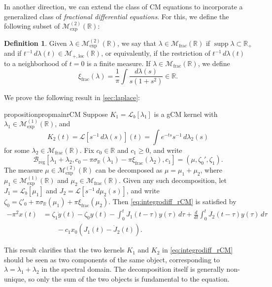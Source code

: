 \documentclass{cams-l} %
\newcommand{\dave}[1]{#1}\newcommand{\davebegin}{}\newcommand{\daveend}{}\newcommand{\george}[1]{#1}
\newcommand{\RR}{\mathbb R}
\newcommand{\cL}{\mathcal L}
\newcommand{\cM}{\mathcal M}
\newcommand{\cB}{\mathcal B}
\newcommand{\supp}{\operatorname{supp}}
\theoremstyle{definition}
\newtheorem{definition}[theorem]{Definition}
\theoremstyle{remark}
\numberwithin{equation}{section}
\begin{document}
In another direction, we can extend the class of CM equations to incorporate a generalized class of \emph{fractional differential equations}. For this, we define the following subset of $\cM_\mathrm{exp}^{(2)}(\RR)$:
\begin{definition}
    Given $\lambda\in\cM_\mathrm{exp}^{(2)}(\RR)$, we say that $\lambda\in\cM_\mathrm{frac}(\RR)$ if \dave{$\supp\lambda\subset\RR_+$} and if $t^{-1}\,d\lambda(t)\in\cM_{+,\mathrm{loc}}(\RR)$, or equivalently, if the restriction of $t^{-1}\,d\lambda(t)$ to a neighborhood of $t=0$ is a finite measure. If $\lambda\in\cM_\mathrm{frac}(\RR)$, we define
    \[\xi_\mathrm{frac}(\lambda) = \frac{1}{\pi}\int\frac{d\lambda(s)}{s(1+s^2)}\in\RR.\]
\end{definition}

We prove the following result in \cref{sec:laplace}:
\begin{restatable}{proposition}{propmainrCM}\label{prop:rCM}
Suppose $K_1=\cL_b[\lambda_1]$ is a gCM kernel with $\lambda_1\in\cM_\mathrm{exp}^{(1)}(\RR)$, and
\[K_2(t) = \cL[s^{-1}\,d\lambda(s)](t) = \int e^{-ts}s^{-1}\,d\lambda_2(s)\]
for some $\lambda_2\in\cM_\mathrm{frac}(\RR)$. Fix $c_0\in\RR$ and $c_1\geq 0$, and write 
\[\cB_\mathrm{reg}[\lambda_1+\lambda_2,c_0-\pi\sigma_\RR(\lambda_1) - \pi\xi_\mathrm{frac}(\lambda_2),c_1] = (\mu, \zeta_0',\zeta_1).\]
The measure $\mu\in\cM_\mathrm{exp}^{(2)}(\RR)$ can be decomposed as $\mu=\mu_1+\mu_2$, where $\mu_1\in\cM_\mathrm{exp}^{(1)}(\RR)$ and $\mu_2\in\cM_\mathrm{frac}(\RR)$. Given any such decomposition, let $J_1 = \cL_b[\mu_1]$ and $J_2=\cL[s^{-1}\,d\mu_2(s)]$, and write $\zeta_0 = \zeta'_0 + \pi\sigma_\RR(\mu_1) + \pi\xi_\mathrm{frac}(\mu_2)$. Then \ref{eq:integrodiff_rCM} is satisfied by
\begin{align*}-\pi^2x(t) &= \zeta_1\dot{y}(t) - \zeta_0y(t) - \int_0^t J_1(t-\tau)y(\tau)\,d\tau + \frac{d}{dt}\int_0^t J_2(t-\tau)y(\tau)\,d\tau\\
&\qquad -c_1x_0(J_1(t) - \dot{J}_2(t)).
\end{align*}
\end{restatable}

This result clarifies that the two kernels $K_1$ and $K_2$ in \ref{eq:integrodiff_rCM} should be seen as two components of the same object, corresponding to $\lambda = \lambda_1+\lambda_2$ in the spectral domain. The decomposition itself is generally non-unique, so only the sum of the two objects is fundamental to the equation.
\end{document}
